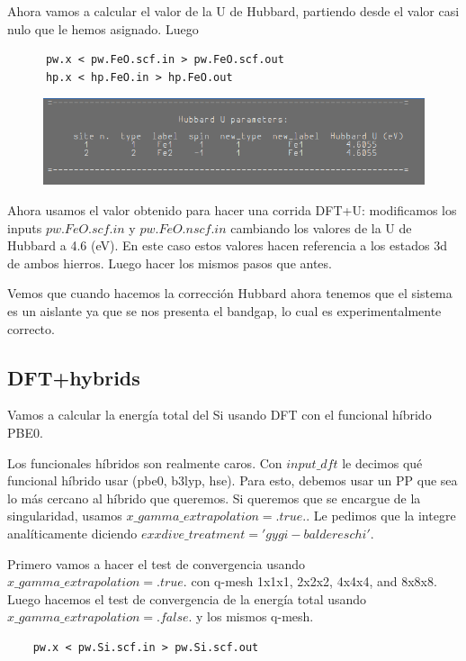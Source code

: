   Ahora vamos a calcular el valor de la U de Hubbard, partiendo desde el valor casi nulo que le hemos asignado. Luego
    \begin{verbatim}
      pw.x < pw.FeO.scf.in > pw.FeO.scf.out
      hp.x < hp.FeO.in > hp.FeO.out
    \end{verbatim}

    \begin{figure}[H]
        \centering
        \includegraphics[scale = 0.5]{figs/D4/U.png}
    \end{figure}

  Ahora usamos el valor obtenido para hacer una corrida DFT+U: modificamos los inputs $pw.FeO.scf.in$ y $pw.FeO.nscf.in$ cambiando los valores de la U de Hubbard a 4.6 (eV). En este caso estos valores hacen referencia a los estados 3d de ambos hierros. Luego hacer los mismos pasos que antes.

  Vemos que cuando hacemos la corrección Hubbard ahora tenemos que el sistema es un aislante ya que se nos presenta el bandgap, lo cual es experimentalmente correcto.

\subsection{DFT+hybrids}

  Vamos a calcular la energía total del Si usando DFT con el funcional híbrido PBE0.

  Los funcionales híbridos son realmente caros. Con $input\_dft$ le decimos qué funcional híbrido usar (pbe0, b3lyp, hse). Para esto, debemos usar un PP que sea lo más cercano al híbrido que queremos. Si queremos que se encargue de la singularidad, usamos $x\_gamma\_extrapolation = .true.$. Le pedimos que la integre analíticamente diciendo $exxdive\_treatment = 'gygi-baldereschi'$.


  Primero vamos a hacer el test de convergencia usando $x\_gamma\_extrapolation = .true.$ con q-mesh 1x1x1, 2x2x2, 4x4x4, and 8x8x8. Luego hacemos el test de convergencia de la energía total usando $x\_gamma\_extrapolation = .false.$ y los mismos q-mesh.
  \begin{verbatim}
    pw.x < pw.Si.scf.in > pw.Si.scf.out
  \end{verbatim}

